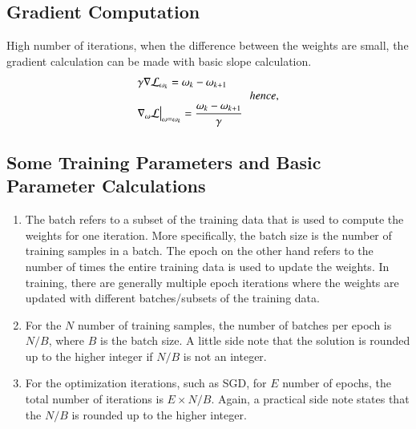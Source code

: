 \documentclass[3p,times,procedia]{elsarticle}
\begin{document}
\vspace{-0.5em}
\subsection{\textbf{Gradient Computation}}
High number of iterations, when the difference between the weights are small, the gradient calculation can be made with basic slope calculation.
\vspace{-0.7em}
\begin{equation*}
    \begin{array}{l}
         \textrm{$ \textstyle  \gamma \nabla \mathcal{L}_{\omega_{k}} = \omega_{k} - \omega_{k+1}  $} \\
        \hspace{10em} hence, \\
         \displaystyle \textrm{$  \nabla_{\omega} \mathcal{L}\big\rvert_{\omega = \omega_{k}} = \frac{\omega_{k} - \omega_{k+1}}{\gamma}$}   \\
    \end{array}
\end{equation*}

\subsection{\textbf{Some Training Parameters and Basic Parameter Calculations}}
\begin{enumerate}
    \item The batch refers to a subset of the training data that is used to compute the weights for one iteration. More specifically, the batch size is the number of training samples in a batch.
 The epoch on the other hand refers to the number of times the entire training data is used to update the weights. In training, there are generally multiple epoch iterations where the weights are updated with different batches/subsets of the training data.
    \item For the $N$ number of training samples, the number of batches per epoch is $N/B$, where $B$ is the batch size. A little side note that the solution is rounded up to the higher integer if $N/B$ is not an integer.
    \item For the optimization iterations, such as SGD, for $E$ number of epochs, the total number of iterations is $E \times N/B$. Again, a practical side note states that the $N/B$ is rounded up to the higher integer.
\end{enumerate}
\end{document}
